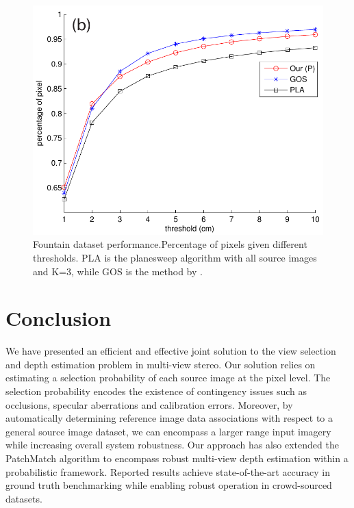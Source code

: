 \begin{figure}
\centering
\centering
\includegraphics[width=0.60\linewidth]{chapter3/resource/compareGoesele.pdf}
\caption[Comparison again the Goesele's method and the best-K planesweeping method on the fountain dataset.]{Fountain dataset performance.Percentage of pixels given different thresholds.  PLA is the planesweep algorithm with all source images and K=3, while GOS is the method by \citet{Goesele07}.}
\label{fig:compareGoesele}
\end{figure}


\section{Conclusion}
We have presented an efficient and effective joint solution to the view selection and depth estimation problem in multi-view stereo. Our solution relies on estimating a selection probability of each source image at the pixel level. The selection probability encodes the existence of contingency issues such as occlusions, specular aberrations and calibration errors. Moreover, by automatically determining reference image data associations with respect to a general source image dataset, we can encompass a larger range input imagery while increasing overall system robustness. Our approach has also extended the PatchMatch algorithm to encompass robust multi-view depth estimation within a probabilistic framework. Reported results achieve state-of-the-art accuracy in ground truth benchmarking while enabling robust operation in crowd-sourced datasets. 


